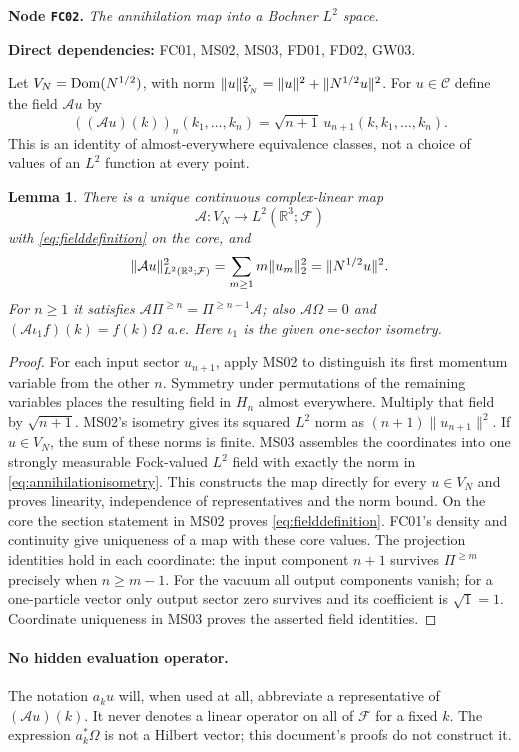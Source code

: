 \documentclass[11pt,a4paper]{article}
\newtheorem{lemma}[theorem]{Lemma}
\theoremstyle{remark}\newtheorem{remark}[theorem]{Remark}
\newcommand{\R}{\mathbb R}\newcommand{\C}{\mathbb C}\newcommand{\N}{\mathbb N}
\newcommand{\F}{\mathcal F}\newcommand{\Q}{\mathcal Q}\newcommand{\HH}{\mathcal H}
\newcommand{\node}[3]{\par\Needspace{6\baselineskip}\smallskip\hypertarget{node:#1}{}\label{nodepage:#1}\noindent\textbf{Node \texttt{#1}.} \textit{#2.}\par\noindent\textbf{Direct dependencies:} #3.\par}
\begin{document}
\node{FC02}{The annihilation map into a Bochner $L^2$ space}{FC01, MS02, MS03, FD01, FD02, GW03}
Let $V_N=\operatorname{Dom}(N^{1/2})$, with norm
$\lVert u\rVert_{V_N}^2=\lVert u\rVert^2+\lVert N^{1/2}u\rVert^2$.
For $u\in\mathscr C$ define the field $\mathcal A u$ by
\begin{equation}
 ((\mathcal A u)(k))_n(k_1,\ldots,k_n)
   =\sqrt{n+1}\,u_{n+1}(k,k_1,\ldots,k_n).
 \label{eq:fielddefinition}
\end{equation}
This is an identity of almost-everywhere equivalence classes, not a choice of values of an $L^2$ function at every point.

\begin{lemma}\label{lem:annihilationmap}
There is a unique continuous complex-linear map
\[
 \mathcal A:V_N\longrightarrow L^2(\R^3;\F)
\]
with \eqref{eq:fielddefinition} on the core, and
\begin{equation}
 \norm{\mathcal A u}_{L^2(\R^3;\F)}^2
   =\sum_{m\geq1}m\norm{u_m}_2^2
   =\norm{N^{1/2}u}^2.\label{eq:annihilationisometry}
\end{equation}
For $n\geq1$ it satisfies
$\mathcal A\Pi^{\geq n}=\Pi^{\geq n-1}\mathcal A$;
also $\mathcal A\Omega=0$ and $(\mathcal A\iota_1f)(k)=f(k)\Omega$ a.e.
Here $\iota_1$ is the given one-sector isometry.
\end{lemma}
\begin{proof}
For each input sector $u_{n+1}$, apply MS02 to distinguish its first momentum variable from the other $n$. Symmetry under permutations of the remaining variables places the resulting field in $H_n$ almost everywhere. Multiply that field by $\sqrt{n+1}$. MS02's isometry gives its squared $L^2$ norm as $(n+1)\|u_{n+1}\|^2$. If $u\in V_N$, the sum of these norms is finite. MS03 assembles the coordinates into one strongly measurable Fock-valued $L^2$ field with exactly the norm in \eqref{eq:annihilationisometry}. This constructs the map directly for every $u\in V_N$ and proves linearity, independence of representatives and the norm bound. On the core the section statement in MS02 proves \eqref{eq:fielddefinition}. FC01's density and continuity give uniqueness of a map with these core values. The projection identities hold in each coordinate: the input component $n+1$ survives $\Pi^{\geq m}$ precisely when $n\geq m-1$. For the vacuum all output components vanish; for a one-particle vector only output sector zero survives and its coefficient is $\sqrt1=1$. Coordinate uniqueness in MS03 proves the asserted field identities.
\end{proof}
\paragraph{No hidden evaluation operator.}
The notation $a_ku$ will, when used at all, abbreviate a representative of $(\mathcal A u)(k)$. It never denotes a linear operator on all of $\F$ for a fixed $k$. The expression $a_k^*\Omega$ is not a Hilbert vector; this document's proofs do not construct it.
\end{document}
